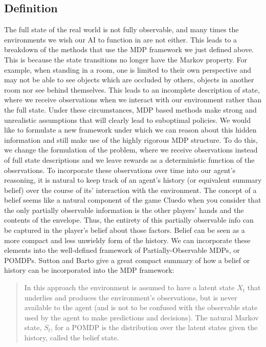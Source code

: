 \documentclass[msc, deptreport, ai, romanprepages]{infthesis}
\begin{document}
\subsection{Definition}
The full state of the real world is not fully observable, and many times the environments we wish our AI to function in are not either. This leads to a breakdown of the methods that use the MDP framework we just defined above. This is because the state transitions no longer have the Markov property. For example, when standing in a room, one is limited to their own perspective and may not be able to see objects which are occluded by others, objects in another room nor see behind themselves. This leads to an incomplete description of state, where we receive observations when we interact with our environment rather than the full state. Under these circumstances, MDP based methods make strong and unrealistic assumptions that will clearly lead to suboptimal policies. We would like to formulate a new framework under which we can reason about this hidden information and still make use of the highly rigorous MDP structure. To do this, we change the formulation of the problem, where we receive observations instead of full state descriptions and we leave rewards as a deterministic function of the observations. To incorporate these observations over time into our agent’s reasoning, it is natural to keep track of an agent’s history (or equivalent summary belief) over the course of its’ interaction with the environment. The concept of a belief seems like a natural component of the game Cluedo when you consider that the only partially observable information is the other players’ hands and the contents of the envelope. Thus, the entirety of this partially observable info can be captured in the player’s belief about those factors. Belief can be seen as a more compact and less unwieldy form of the history. We can incorporate these elements into the well-defined framework of Partially-Observable MDPs, or POMDPs. Sutton and Barto give a great compact summary of how a belief or history can be incorporated into the MDP framework:
\begin{quote}
In this approach the environment is assumed to have a latent state \(X_t\) that underlies and produces the environment’s observations, but is never available to the agent (and is not to be confused with the observable state used by the agent to make predictions and decisions). The natural Markov state, \(S_t\), for a POMDP is the distribution over the latent states given the history, called the belief state. \cite{Sutton-barto}
\end{quote}
\end{document}
